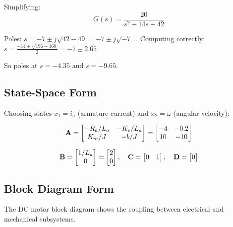 Simplifying:
\begin{equation}
G(s) = \frac{20}{s^2 + 14s + 42}
\end{equation}

Poles: $s = -7 \pm j\sqrt{42-49} = -7 \pm j\sqrt{-7}$... Computing correctly: $s = \frac{-14 \pm \sqrt{196 - 168}}{2} = -7 \pm 2.65$

So poles at $s = -4.35$ and $s = -9.65$.

\subsection{State-Space Form}

Choosing states $x_1 = i_a$ (armature current) and $x_2 = \omega$ (angular velocity):

\begin{equation}
\mathbf{A} = \begin{bmatrix} -R_a/L_a & -K_e/L_a \\ K_m/J & -b/J \end{bmatrix} = \begin{bmatrix} -4 & -0.2 \\ 10 & -10 \end{bmatrix}
\end{equation}

\begin{equation}
\mathbf{B} = \begin{bmatrix} 1/L_a \\ 0 \end{bmatrix} = \begin{bmatrix} 2 \\ 0 \end{bmatrix}, \quad
\mathbf{C} = \begin{bmatrix} 0 & 1 \end{bmatrix}, \quad
\mathbf{D} = \begin{bmatrix} 0 \end{bmatrix}
\end{equation}

\subsection{Block Diagram Form}

The DC motor block diagram shows the coupling between electrical and mechanical subsystems.

